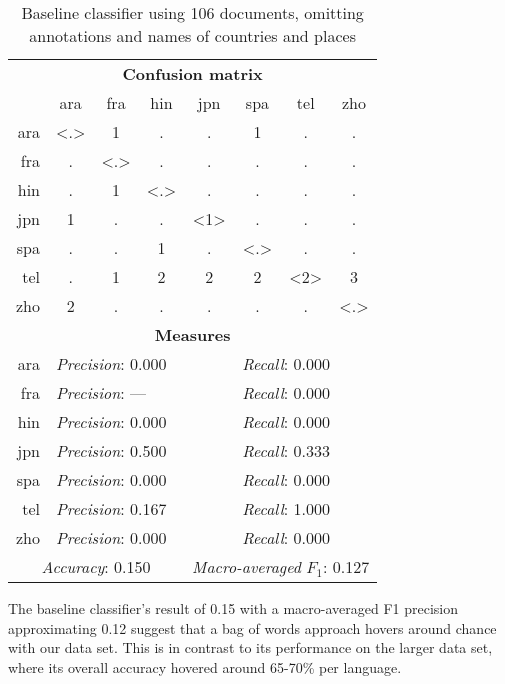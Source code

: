 \documentclass[10pt, a4paper]{article}
\begin{document}
\begin{table}[!h]
	\begin{center}
		\begin{tabular}{r|c|c|c|c|c|c|c}	
			\multicolumn{8}{c}{\textbf{Confusion matrix}}\\
			~&ara & fra & hin & jpn & spa & tel & zho\\
			\hline
			ara & <.> & 1 & . & . & 1 & . & . \\
			fra & . & <.> & . & . & . & . & . \\
			hin & . & 1 & <.> & . & . & . & . \\
			jpn & 1 & . & . & <1> & . & . & . \\
			spa & . & . & 1 & . & <.> & . & . \\
			tel & . & 1 & 2 & 2 & 2 & <2> & 3 \\
			zho & 2 & . & . & . & . & . & <.> \\
			
			\multicolumn{8}{c}{\textbf{Measures}}\\
			ara & \multicolumn{4}{l}{\textit{Precision}: 0.000} & \multicolumn{3}{l}{\textit{Recall}: 0.000}	\\
			fra & \multicolumn{4}{l}{\textit{Precision}: ---} & \multicolumn{3}{l}{\textit{Recall}: 0.000}	\\
			hin & \multicolumn{4}{l}{\textit{Precision}: 0.000} & \multicolumn{3}{l}{\textit{Recall}: 0.000}	\\
			jpn & \multicolumn{4}{l}{\textit{Precision}: 0.500} & \multicolumn{3}{l}{\textit{Recall}: 0.333}	\\
			spa & \multicolumn{4}{l}{\textit{Precision}: 0.000} & \multicolumn{3}{l}{\textit{Recall}: 0.000}	\\
			tel & \multicolumn{4}{l}{\textit{Precision}: 0.167} & \multicolumn{3}{l}{\textit{Recall}: 1.000}	\\
			zho & \multicolumn{4}{l}{\textit{Precision}: 0.000} & \multicolumn{3}{l}{\textit{Recall}: 0.000}	\\
			\multicolumn{4}{c}{\textit{Accuracy}: 0.150} & \multicolumn{4}{l}{\textit{Macro-averaged }$F_1$: 0.127} 
		\end{tabular}
		\caption{Baseline classifier using 106 documents, omitting annotations and names of countries and places\label{table:baseline}}
	\end{center}
\end{table}

The baseline classifier's result of 0.15 with a macro-averaged F1 precision approximating 0.12 suggest that a bag of words approach hovers around chance with our data set. This is in contrast to its performance on the larger data set, where its overall accuracy hovered around 65-70\% per language. 
\end{document}
